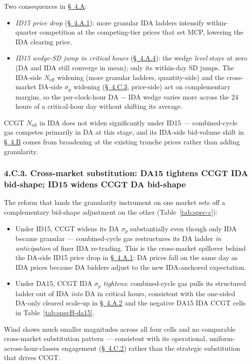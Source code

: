 \documentclass[11pt]{article}
\begin{document}
Two consequences in \hyperref[sec:4-specA]{\S~4.A}:
\begin{itemize}\setlength{\itemsep}{1pt}
\item \emph{ID15 price drop} (\hyperref[sec:4ii]{\S~4.A.1}): more granular IDA ladders intensify within-quarter competition at the competing-tier prices that set MCP, lowering the IDA clearing price.
\item \emph{ID15 wedge-SD jump in critical hours} (\hyperref[sec:4-wedge]{\S~4.A.4}): the wedge \emph{level} stays at zero (DA and IDA still converge in mean); only its within-day SD jumps. The IDA-side $N_{\text{eff}}$ widening (more granular ladders, quantity-side) and the cross-market DA-side $\sigma_p$ widening (\hyperref[sec:4-c-cross]{\S~4.C.3}, price-side) act on complementary margins, so the per-clock-hour DA $-$ IDA wedge varies more across the 24 hours of a critical-hour day without shifting its average.
\end{itemize}
CCGT $N_{\text{eff}}$ in IDA does not widen significantly under ID15 --- combined-cycle gas competes primarily in DA at this stage, and its IDA-side bid-volume shift in \hyperref[sec:4-specB]{\S~4.B} comes from broadening at the existing tranche prices rather than adding granularity.

\subsubsection*{4.C.3. Cross-market substitution: DA15 tightens CCGT IDA bid-shape; ID15 widens CCGT DA bid-shape}\label{sec:4-c-cross}
The reform that lands the granularity instrument on one market sets off a complementary bid-shape adjustment on the other (Table~\ref{tab:spec-c}):
\begin{itemize}\setlength{\itemsep}{1pt}
\item Under ID15, CCGT widens its DA $\sigma_p$ substantially even though only IDA became granular --- combined-cycle gas restructures its DA ladder \emph{in anticipation} of finer IDA re-trading. This is the cross-market spillover behind the DA-side ID15 price drop in \hyperref[sec:4ii]{\S~4.A.1}: DA prices fall on the same day as IDA prices because DA bidders adjust to the new IDA-anchored expectation.
\item Under DA15, CCGT IDA $\sigma_p$ \emph{tightens}: combined-cycle gas pulls its structured ladder out of IDA \emph{into} DA in critical hours, consistent with the one-sided DA-only cleared scale-up in \hyperref[sec:4iii]{\S~4.A.2} and the negative DA15 IDA CCGT cells in Table~\ref{tab:specB-da15}.
\end{itemize}
Wind shows much smaller magnitudes across all four cells and no comparable cross-market substitution pattern --- consistent with its operational, uniform-across-hour-classes engagement (\hyperref[sec:4-c-id15-ida]{\S~4.C.2}) rather than the strategic substitution that drives CCGT.
\end{document}
